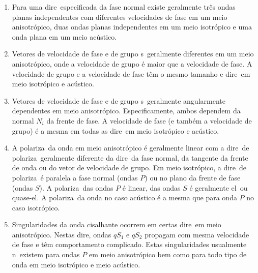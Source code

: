 \begin{enumerate}
\item Para uma dire\cao\ especificada da fase normal
existe geralmente tr\^es ondas planas independentes
com diferentes velocidades de fase em um meio
anisotr\'opico, duas ondas planas independentes
em um meio isotr\'opico e uma onda plana em um meio
ac\'ustico.

\item Vetores de velocidade de fase e de grupo s\ao\
geralmente diferentes em um meio anisotr\'opico,
onde a velocidade de grupo \'e maior que a velocidade
de fase. A velocidade de grupo e a velocidade de
fase t\^em o mesmo tamanho e dire\cao\ em meio
isotr\'opico e ac\'ustico.

\item Vetores de velocidade de fase e de grupo s\ao\
geralmente angularmente dependentes em meio
anisotr\'opico. Especificamente, ambos dependem da
normal $N_i$ da frente de fase. A velocidade de fase
(e tamb\'em a velocidade de grupo) \'e a mesma em
todas as dire\coes\ em meio isotr\'opico e ac\'ustico.

\item A polariza\cao\ da onda em meio anisotr\'opico
\'e geralmente linear com a dire\cao\ de polariza\cao\
geralmente diferente da dire\cao\ da fase normal, da
tangente da frente de onda ou do vetor de velocidade
de grupo. Em meio isotr\'opico, a dire\cao\ de
polariza\cao\ \'e paralela a fase normal (ondas $P$)
ou no plano da frente de fase (ondas $S$). A
polariza\cao\ das ondas $P$ \'e linear, das ondas
$S$ \'e geralmente el\iptica\ ou quase-el\iptica.
A polariza\cao\ da onda no caso ac\'ustico \'e a 
mesma que para onda $P$ no caso isotr\'opico.

\item Singularidades da onda cisalhante ocorrem
em certas dire\coes\ em meio anisotr\'opico. Nestas
dire\coes, ondas $qS_1$ e $qS_2$ propagam com mesma
velocidade de fase e t\^em comportamento complicado.
Estas singularidades usualmente n\ao\ existem para
ondas $P$ em meio anisotr\'opico bem como para todo
tipo de onda em meio isotr\'opico e meio ac\'ustico.  

\end{enumerate}

